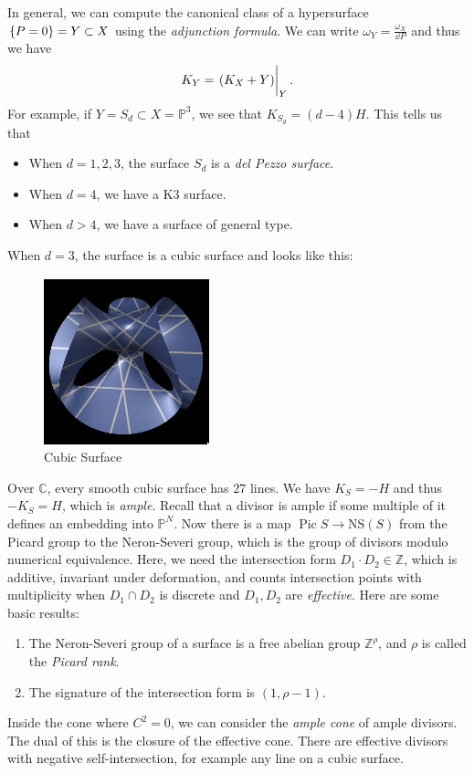\documentclass[leqno, openany]{memoir}
\theoremstyle{definition}
\theoremstyle{remark}
\theoremstyle{plain}
\theoremstyle{definition}
\theoremstyle{remark}
\newcommand{\C}{\mathbb{C}}
\newcommand{\Z}{\mathbb{Z}}
\renewcommand{\P}{\mathbb{P}}
\newcommand{\mr}[1]{\mathrm{#1}}
\DeclareMathOperator{\Pic}{Pic}
\begin{document}
In general, we can compute the canonical class of a hypersurface $\qty{P=0} = Y \subset X$ using the \textit{adjunction formula}. We can write $\omega_Y = \frac{\omega_X}{\dd{P}}$ and thus we have
\[ K_Y = \eval{(K_X + Y)}_{Y}. \]
For example, if $Y = S_d \subset X = \P^3$, we see that $K_{S_d} = (d-4)H$. This tells us that
\begin{itemize}
    \item When $d = 1,2,3$, the surface $S_d$ is a \textit{del Pezzo surface}. 
    \item When $d=4$, we have a K3 surface.
    \item When $d > 4$, we have a surface of general type.
\end{itemize}

When $d = 3$, the surface is a cubic surface and looks like this:
\begin{figure}[H]
    \centering
    \includegraphics[scale=1]{cubicsurf.png}
    \caption{Cubic Surface}%
    \label{fig:}
\end{figure}
Over $\C$, every smooth cubic surface has $27$ lines. We have $K_S = -H$ and thus $-K_S = H$, which is \textit{ample}. Recall that a divisor is ample if some multiple of it defines an embedding into $\P^N$. Now there is a map $\Pic S \to \mr{NS}(S)$ from the Picard group to the Neron-Severi group, which is the group of divisors modulo numerical equivalence. Here, we need the intersection form $D_1 \cdot D_2 \in \Z$, which is additive, invariant under deformation, and counts intersection points with multiplicity when $D_1 \cap D_2$ is discrete and $D_1, D_2$ are \textit{effective}. Here are some basic results:
\begin{enumerate}
    \item The Neron-Severi group of a surface is a free abelian group $\Z^{\rho}$, and $\rho$ is called the \textit{Picard rank}.
    \item The signature of the intersection form is $(1, \rho -1)$.
\end{enumerate}
Inside the cone where $C^2 = 0$, we can consider the \textit{ample cone} of ample divisors. The dual of this is the closure of the effective cone. There are effective divisors with negative self-intersection, for example any line on a cubic surface.
\end{document}
